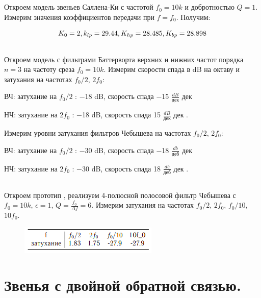 \documentclass[15pt,a5paper,reqno]{article}
\begin{document}
\subsection{}
Откроем модель звеньев Саллена-Ки с частотой $f_0 = 10k$ и добротностью $Q = 1$.
Измерим значения коэффициентов передачи при $f = f_0$. Получим:

\begin{equation*}
    K_0 = 2, \space k_{lp} = 29.44, \space K_{hp} = 28.485, \space K_{bp} = 28.898
\end{equation*}

\subsection{}

Откроем модель с фильтрами Баттерворта верхних и нижних частот
порядка $n = 3$ на частоту среза $f_0 = 10k$. Измерим скорости спада в dB на октаву и
затухания на частотах $f_0/2$, $2f_0$:
\par
ВЧ: затухание на $f_0/2$ : −18 dB, скорость спада −15 $\frac{dB}{\text{дек}}$
дек
\par
НЧ: затухание на $2f_0$ : −18 dB, скорость спада 15 $\frac{dB}{\text{дек}}$
дек
.
\medskip
\par
Измерим уровни затухания фильтров Чебышева на частотах $f_0/2$, $2f_0$:
\par
ВЧ: затухание на $f_0/2$ : −30 dB, скорость спада −18 $\frac{db}{\text{деб}}$
дек
\par
НЧ: затухание на $2f_0$ : −30 dB, скорость спада 18 $\frac{db}{\text{деб}}$
дек
.

\subsection{}
Откроем прототип , реализуем 4-полюсной полосовой фильтр Чебышева
с  $f_0 = 10k$, $\epsilon = 1$, $Q = \frac{f_0}{\Delta f} = 6$. Измерим затухания на частотах $f_0/2$, $2f_0$, $f_0/10$, $10f_0$.

\begin{figure}[h!]
    \centering
    \includegraphics[width=0.4\linewidth]{pics/pic11.png}
\end{figure}

\section{ Звенья с двойной обратной связью.}
\end{document}
